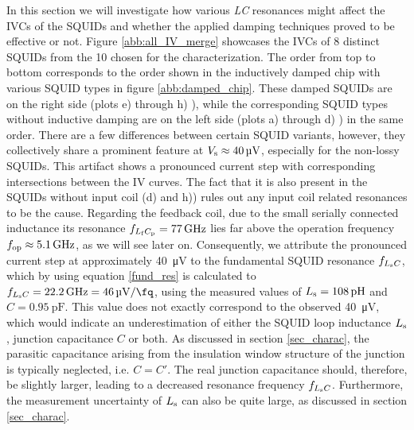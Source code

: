In this section we will investigate how various \textit{LC} resonances might affect the IVCs of the SQUIDs and whether the applied damping techniques proved to be effective or not. Figure \ref{abb:all_IV_merge} showcases the IVCs of 8 distinct SQUIDs from the 10 chosen for the characterization. The order from top to bottom corresponds to the order shown in the inductively damped chip with various SQUID types in figure \ref{abb:damped_chip}. These damped SQUIDs are on the right side (plots e) through h) ), while the corresponding SQUID types without inductive damping are on the left side (plots a) through d) ) in the same order. There are a few differences between certain SQUID variants, however, they collectively share a prominent feature at $V_{\rm s}\approx\qty{40}{\uV}$, especially for the non-lossy SQUIDs. This artifact shows a pronounced current step with corresponding intersections between the IV curves. The fact that it is also present in the SQUIDs without input coil (d) and h)) rules out any input coil related resonances to be the cause. Regarding the feedback coil, due to the small serially connected inductance its resonance $f_{L_{\rm f}C_{\rm p}}=\qty{77}{\GHz}$ lies far above the operation frequency $f_{\rm op}\approx \qty{5.1}{\GHz}$, as we will see later on. Consequently, we attribute the pronounced current step at approximately \qty{40}{\uV} to the fundamental SQUID resonance $f_{L_{\rm s}C}$, which by using equation \ref{fund_res} is calculated to $f_{L_{\rm s}C}=\qty{22.2}{\GHz}=\qty{46}{\uV\per\fq}$, using the measured values of $L_{\rm s}=\qty{108}{\pH}$ and $C=\qty{0.95}{\pF}$. This value does not exactly correspond to the observed \qty{40}{\uV}, which would indicate an underestimation of either the SQUID loop inductance $L_{\rm s}$, junction capacitance $C$ or both. As discussed in section \ref{sec_charac}, the parasitic capacitance arising from the insulation window structure of the junction is typically neglected, i.e. $C=C'$. The real junction capacitance should, therefore, be slightly larger, leading to a decreased resonance frequency $f_{L_{\rm s}C}$. 
Furthermore, the measurement uncertainty of $L_{\rm s}$ can also be quite large, as discussed in section \ref{sec_charac}.

